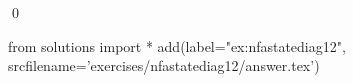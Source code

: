 
\begin{ex} 
  \label{ex:nfastatediag12}
  
  \qed
\end{ex} 
\begin{python0}
from solutions import *
add(label="ex:nfastatediag12",
    srcfilename='exercises/nfastatediag12/answer.tex') 
\end{python0}

